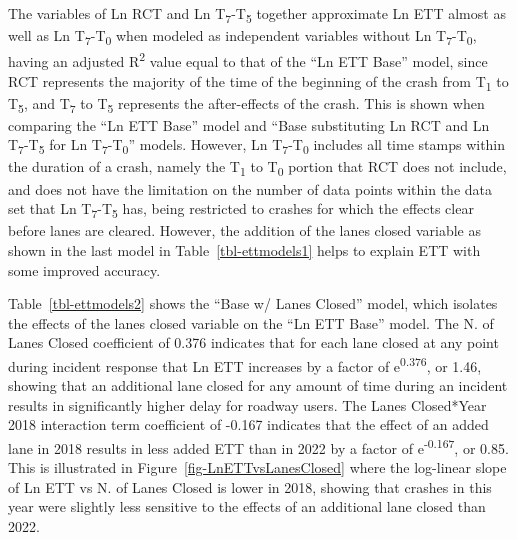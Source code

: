 \documentclass[
  letterpaper,
  authoryear]{elsarticle}
\begin{document}
The variables of Ln RCT and Ln T\textsubscript{7}-T\textsubscript{5}
together approximate Ln ETT almost as well as Ln
T\textsubscript{7}-T\textsubscript{0} when modeled as independent
variables without Ln T\textsubscript{7}-T\textsubscript{0}, having an
adjusted R\textsuperscript{2} value equal to that of the ``Ln ETT Base''
model, since RCT represents the majority of the time of the beginning of
the crash from T\textsubscript{1} to T\textsubscript{5}, and
T\textsubscript{7} to T\textsubscript{5} represents the after-effects of
the crash. This is shown when comparing the ``Ln ETT Base'' model and
``Base substituting Ln RCT and Ln T\textsubscript{7}-T\textsubscript{5}
for Ln T\textsubscript{7}-T\textsubscript{0}'' models. However, Ln
T\textsubscript{7}-T\textsubscript{0} includes all time stamps within
the duration of a crash, namely the T\textsubscript{1} to
T\textsubscript{0} portion that RCT does not include, and does not have
the limitation on the number of data points within the data set that Ln
T\textsubscript{7}-T\textsubscript{5} has, being restricted to crashes
for which the effects clear before lanes are cleared. However, the
addition of the lanes closed variable as shown in the last model in
Table~\ref{tbl-ettmodels1} helps to explain ETT with some improved
accuracy.

Table~\ref{tbl-ettmodels2} shows the ``Base w/ Lanes Closed'' model,
which isolates the effects of the lanes closed variable on the ``Ln ETT
Base'' model. The N. of Lanes Closed coefficient of 0.376 indicates that
for each lane closed at any point during incident response that Ln ETT
increases by a factor of e\textsuperscript{0.376}, or 1.46, showing that
an additional lane closed for any amount of time during an incident
results in significantly higher delay for roadway users. The Lanes
Closed*Year 2018 interaction term coefficient of -0.167 indicates that
the effect of an added lane in 2018 results in less added ETT than in
2022 by a factor of e\textsuperscript{-0.167}, or 0.85. This is
illustrated in Figure~\ref{fig-LnETTvsLanesClosed} where the log-linear
slope of Ln ETT vs N. of Lanes Closed is lower in 2018, showing that
crashes in this year were slightly less sensitive to the effects of an
additional lane closed than 2022.
\end{document}
